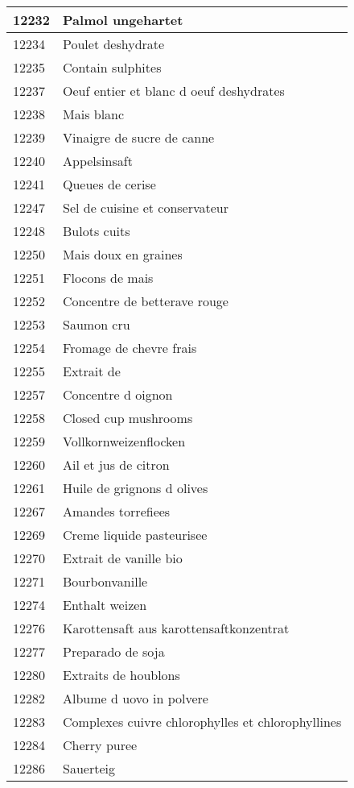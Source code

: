 \begin{longtable}{|l|l|}
12232 & Palmol ungehartet \\ \hline 
12234 & Poulet deshydrate \\ \hline 
12235 & Contain sulphites \\ \hline 
12237 & Oeuf entier et blanc d oeuf deshydrates \\ \hline 
12238 & Mais blanc \\ \hline 
12239 & Vinaigre de sucre de canne \\ \hline 
12240 & Appelsinsaft \\ \hline 
12241 & Queues de cerise \\ \hline 
12247 & Sel de cuisine et conservateur \\ \hline 
12248 & Bulots cuits \\ \hline 
12250 & Mais doux en graines \\ \hline 
12251 & Flocons de mais \\ \hline 
12252 & Concentre de betterave rouge \\ \hline 
12253 & Saumon cru \\ \hline 
12254 & Fromage de chevre frais \\ \hline 
12255 & Extrait de \\ \hline 
12257 & Concentre d oignon \\ \hline 
12258 & Closed cup mushrooms \\ \hline 
12259 & Vollkornweizenflocken \\ \hline 
12260 & Ail et jus de citron \\ \hline 
12261 & Huile de grignons d olives \\ \hline 
12267 & Amandes torrefiees \\ \hline 
12269 & Creme liquide pasteurisee \\ \hline 
12270 & Extrait de vanille bio \\ \hline 
12271 & Bourbonvanille \\ \hline 
12274 & Enthalt weizen \\ \hline 
12276 & Karottensaft aus karottensaftkonzentrat \\ \hline 
12277 & Preparado de soja \\ \hline 
12280 & Extraits de houblons \\ \hline 
12282 & Albume d uovo in polvere \\ \hline 
12283 & Complexes cuivre chlorophylles et chlorophyllines \\ \hline 
12284 & Cherry puree \\ \hline 
12286 & Sauerteig \\ \hline 

\end{longtable}
